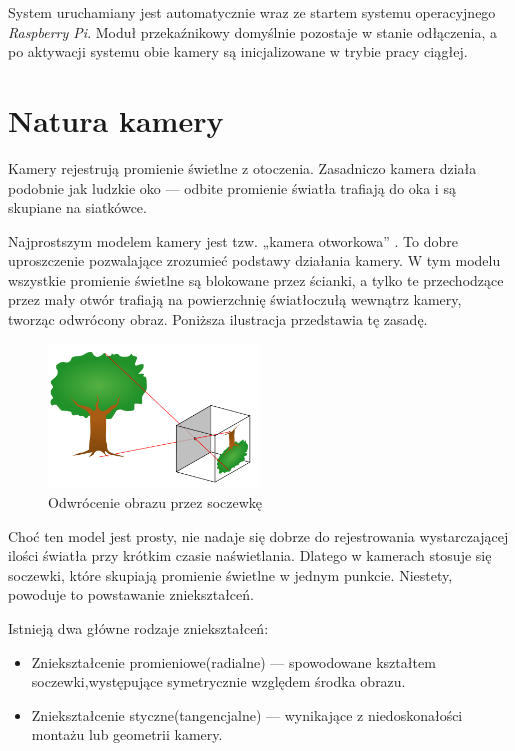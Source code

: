 \documentclass[magisterska]{pracadypl}
\begin{document}
System uruchamiany jest automatycznie wraz ze startem systemu operacyjnego \textit{Raspberry Pi}. Moduł przekaźnikowy domyślnie pozostaje w stanie odłączenia, a po aktywacji systemu obie kamery są inicjalizowane w trybie pracy ciągłej.

\chapter{Natura kamery}

Kamery rejestrują promienie świetlne z otoczenia. Zasadniczo kamera działa podobnie jak ludzkie oko — odbite promienie światła trafiają do oka i są skupiane na siatkówce.

Najprostszym modelem kamery jest tzw. „kamera otworkowa” \cite{otworkowa}. To dobre uproszczenie pozwalające zrozumieć podstawy działania kamery. W tym modelu wszystkie promienie świetlne są blokowane przez ścianki, a tylko te przechodzące przez mały otwór trafiają na powierzchnię światłoczułą wewnątrz kamery, tworząc odwrócony obraz. Poniższa ilustracja przedstawia tę zasadę.

\begin{figure}[H]
    \centering
    \includegraphics[width=0.5\textwidth]{images/light.png}
    \captionsetup{font=footnotesize}
    \caption[Odwrócenie obrazu przez soczewkę. https://funsizephysics.com/use-light-turn-world-upside/]{Odwrócenie obrazu przez soczewkę}
    \label{fig:rpi}
\end{figure}

Choć ten model jest prosty, nie nadaje się dobrze do rejestrowania wystarczającej ilości światła przy krótkim czasie naświetlania. Dlatego w kamerach stosuje się soczewki, które skupiają promienie świetlne w jednym punkcie. Niestety, powoduje to powstawanie zniekształceń.

Istnieją dwa główne rodzaje zniekształceń:

\begin{itemize}
  \item Zniekształcenie promieniowe(radialne) — spowodowane kształtem soczewki,występujące symetrycznie względem środka obrazu.

  \item Zniekształcenie styczne(tangencjalne) — wynikające z niedoskonałości montażu lub geometrii kamery.
\end{itemize}
\end{document}
